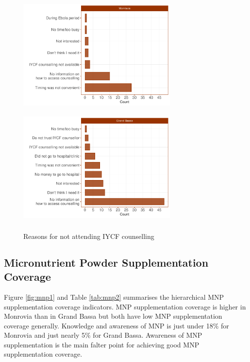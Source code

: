 \documentclass[12pt,a4paper]{article}
\begin{document}
\begin{figure}[H]

{\centering \includegraphics[width=8cm,height=6cm]{liberiaCoverageReport_files/figure-latex/icf3a-1} \includegraphics[width=8cm,height=6cm]{liberiaCoverageReport_files/figure-latex/icf3a-2} 

}

\caption{Reasons for not attending IYCF counselling}\label{fig:icf3a}
\end{figure}

\newpage

\hypertarget{micronutrient-powder-supplementation-coverage}{%
\subsection{Micronutrient Powder Supplementation Coverage}\label{micronutrient-powder-supplementation-coverage}}

Figure \ref{fig:mnp1} and Table \ref{tab:mnp2} summarises the hierarchical MNP supplementation coverage indicators. MNP supplementation coverage is higher in Monrovia than in Grand Bassa but both have low MNP supplementation coverage generally. Knowledge and awareness of MNP is just under 18\% for Monrovia and just nearly 5\% for Grand Bassa. Awareness of MNP supplementation is the main falter point for achieving good MNP supplementation coverage.
\end{document}
